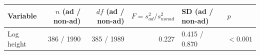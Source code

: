 \begin{tabular}{lrrrll}
\toprule
Variable & $n$ (ad / non-ad) & $df$ (ad / non-ad) & $F=s^2_{ad}/s^2_{nonad}$ & SD (ad / non-ad) & $p$
\\
\midrule
Log height & 386 / 1990 & 385 / 1989 & 0.227 & 0.415 / 0.870 & $<0.001$
\\
\bottomrule
\end{tabular}
